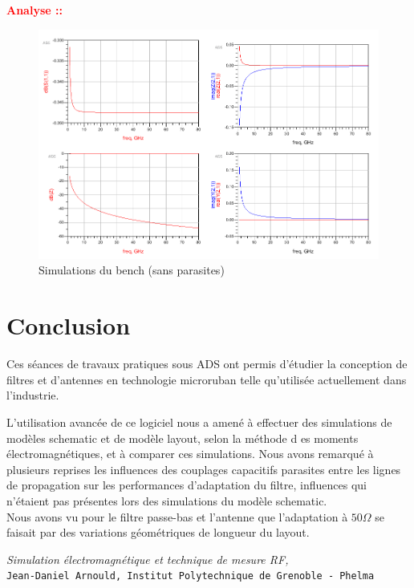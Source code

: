 \documentclass[a4paper]{article}
\begin{document}
\textbf{\textcolor{red}{Analyse :: }}

\begin{figure}[!htb]
\begin{center}
  \includegraphics[scale=0.40]{de-embedding_bench_sim.png}
  \caption{Simulations du bench (sans parasites)}
  \label{de-embedding-bench}
\end{center}
\end{figure}

\clearpage
\section{Conclusion}

Ces s\'eances de travaux pratiques sous ADS ont permis d'\'etudier la conception de filtres et
 d'antennes en technologie microruban telle qu'utilis\'ee actuellement dans l'industrie.

L'utilisation avanc\'ee de ce logiciel nous a amen\'e \`a effectuer des simulations de mod\`eles schematic et de mod\`ele layout, selon la m\'ethode d
es moments \'electromagn\'etiques, et \`a comparer ces simulations. Nous avons remarqu\'e \`a plusieurs reprises les influences des couplages capacitifs
parasites entre les lignes de propagation sur les performances d'adaptation du filtre, influences qui n'\'etaient pas pr\'esentes lors des simulations
du mod\`ele schematic.\\

Nous avons vu pour le filtre passe-bas et l'antenne que l'adaptation \`a $50 \Omega$ se faisait par des variations g\'eom\'etriques de longueur du layout.


\clearpage
{}

\begin{thebibliography}{9}

\textit{Simulation \'electromagn\'etique et technique de mesure RF,}\\
\texttt{Jean-Daniel Arnould, Institut Polytechnique de Grenoble - Phelma}

\end{thebibliography}
\end{document}
